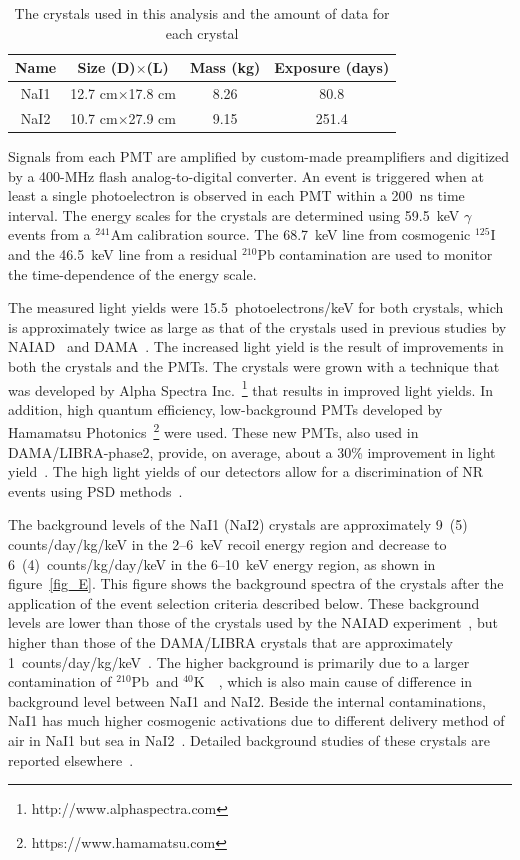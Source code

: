 \documentclass[a4paper,11pt]{article}
\def\pbten{$^{210}$Pb~}
\def\pota{$^{40}$K~}
\begin{document}
\begin{table}[tbp]
\centering
\begin{tabular}{|c|c|c|c|}
\hline
Name & Size (D)$\times$(L) & Mass  (kg) & Exposure (days)\\
\hline
NaI1 & 12.7 cm$\times$17.8 cm & 8.26 & 80.8 \\
NaI2 & 10.7 cm$\times$27.9 cm&  9.15 & 251.4\\
\hline
\end{tabular}
\caption{\label{tab_crystal}The crystals used in this analysis and the amount of data for each crystal}
\end{table}

Signals from each PMT are amplified by custom-made preamplifiers and digitized by a 400-MHz flash analog-to-digital
converter. An event is triggered when at least a single photoelectron is observed in each PMT within a 200~ns time
interval. The energy scales for the crystals are determined using 59.5~keV $\gamma$ events from a $^{241}$Am calibration
source.  The 68.7~keV line from cosmogenic $^{125}$I and the 46.5~keV line from a residual $^{210}$Pb contamination are
used to monitor the time-dependence of the energy scale.

The measured light yields were 15.5~photoelectrons/keV for both crystals, which is approximately twice as large
as that of the crystals used in previous studies by NAIAD~\cite{Alner:2005kt} and DAMA~\cite{Bernabei:2008yh}. 
The increased light yield is the result of improvements in both the crystals and the PMTs. The crystals were grown with
a technique that was developed by Alpha Spectra Inc.~\footnote{http://www.alphaspectra.com} that results in improved light
yields.  In addition, high quantum efficiency, low-background PMTs developed by Hamamatsu
Photonics~\footnote{https://www.hamamatsu.com} were used.  These new PMTs, also used in DAMA/LIBRA-phase2, provide, on
average, about a 30\% improvement in light yield~\cite{bernabei12had}.  The high light yields of our detectors allow for
a discrimination of NR events using PSD methods~\cite{Lee:2015iaa}.

The background levels of the NaI1 (NaI2) crystals are approximately 9~(5) counts/day/kg/keV in the 2--6~keV recoil energy region and decrease to 6~(4)~counts/kg/day/keV in the 6--10~keV energy region, as shown in figure~\ref{fig_E}.
This figure shows the background spectra of the crystals after the application of the event selection criteria described below.  
These background levels are lower than those of the crystals used by the NAIAD experiment~\cite{Alner:2005kt}, but higher than those of the DAMA/LIBRA crystals that are approximately 1~counts/day/kg/keV~\cite{Bernabei:2008yh}. 
The higher background is primarily due to a larger contamination of \pbten and \pota~\cite{kwkim15, adhikari16}, which is also main cause of difference in background level between NaI1 and NaI2.
Beside the internal contaminations, NaI1 has much higher cosmogenic activations due to different delivery method of air in NaI1 but sea in NaI2~\cite{kwkim15}.
Detailed background studies of these crystals are reported elsewhere~\cite{kwkim15,adhikari16,Adhikari:2017gbj}.
\end{document}
